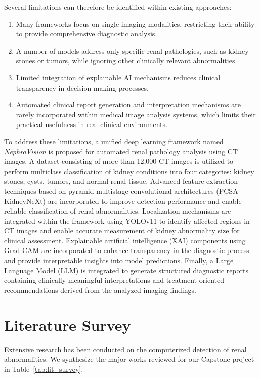 \documentclass[preprint,12pt]{elsarticle}
\begin{document}
Several limitations can therefore be identified within existing approaches:
\begin{enumerate}
    \item Many frameworks focus on single imaging modalities, restricting their ability to provide comprehensive diagnostic analysis.
    \item A number of models address only specific renal pathologies, such as kidney stones or tumors, while ignoring other clinically relevant abnormalities.
    \item Limited integration of explainable AI mechanisms reduces clinical transparency in decision-making processes.
    \item Automated clinical report generation and interpretation mechanisms are rarely incorporated within medical image analysis systems, which limits their practical usefulness in real clinical environments.
\end{enumerate}

To address these limitations, a unified deep learning framework named \textit{NephroVision} is proposed for automated renal pathology analysis using CT images. A dataset consisting of more than 12,000 CT images is utilized to perform multiclass classification of kidney conditions into four categories: kidney stones, cysts, tumors, and normal renal tissue. Advanced feature extraction techniques based on pyramid multistage convolutional architectures (PCSA-KidneyNeXt) are incorporated to improve detection performance and enable reliable classification of renal abnormalities. Localization mechanisms are integrated within the framework using YOLOv11 to identify affected regions in CT images and enable accurate measurement of kidney abnormality size for clinical assessment. Explainable artificial intelligence (XAI) components using Grad-CAM are incorporated to enhance transparency in the diagnostic process and provide interpretable insights into model predictions. Finally, a Large Language Model (LLM) is integrated to generate structured diagnostic reports containing clinically meaningful interpretations and treatment-oriented recommendations derived from the analyzed imaging findings.

\section{Literature Survey}
\label{sec:lit}
Extensive research has been conducted on the computerized detection of renal abnormalities. We synthesize the major works reviewed for our Capstone project in Table~\ref{tab:lit_survey}.
\end{document}
